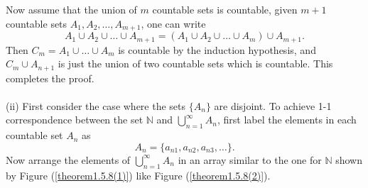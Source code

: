 \documentclass{article}
\begin{document}
            Now assume that the union of $m$ countable sets is countable, given $m+1$ countable sets $A_1,A_2,\dots,A_{m+1}$, one can write
            \begin{equation*}
                A_1 \cup A_2 \cup \dots \cup A_{m+1} = (A_1 \cup A_2 \cup \dots \cup A_m) \cup A_{m+1}.
            \end{equation*}
            Then $C_m = A_1 \cup \dots \cup A_m$ is countable by the induction hypothesis, and $C_m \cup A_{n+1}$ is just the union of two countable sets which is countable. This completes the proof.\\ \\
            (ii) First consider the case where the sets $\{A_n\}$ are disjoint. To achieve 1-1 correspondence between the set $\mathbb{N}$ and $\bigcup_{n=1}^\infty A_n$, first label the elements in each countable set $A_n$ as
            \begin{equation*}
                A_n = \{a_{n1},a_{n2},a_{n3},\dots\}.
            \end{equation*}
            Now arrange the elements of $\bigcup_{n=1}^\infty A_n$ in an array similar to the one for $\mathbb{N}$ shown by Figure (\ref{theorem1.5.8(1)}) like Figure (\ref{theorem1.5.8(2)}).
\end{document}
